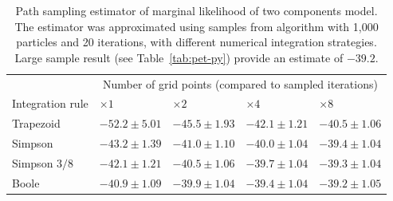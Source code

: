 \begin{table}
  \begingroup\small
  \begin{tabularx}{\linewidth}{lXXXX}
    \toprule
    & \multicolumn{4}{c}{Number of grid points (compared to sampled iterations)} \\
    \cmidrule(lr){2-5}
    Integration rule & $\times1$ & $\times2$ & $\times4$ & $\times8$ \\
    \midrule
    Trapezoid
    & $-52.2\pm5.01$ & $-45.5\pm1.93$ & $-42.1\pm1.21$ & $-40.5\pm1.06$ \\
    Simpson
    & $-43.2\pm1.39$ & $-41.0\pm1.10$ & $-40.0\pm1.04$ & $-39.4\pm1.04$ \\
    Simpson $3/8$
    & $-42.1\pm1.21$ & $-40.5\pm1.06$ & $-39.7\pm1.04$ & $-39.3\pm1.04$ \\
    Boole
    & $-40.9\pm1.09$ & $-39.9\pm1.04$ & $-39.4\pm1.04$ & $-39.2\pm1.05$ \\
    \bottomrule
  \end{tabularx}\endgroup
  \caption[\protect\pet compartmental model path sampling estimates bias
  reduction]
  {Path sampling estimator of marginal likelihood of two components
    \pet model. The estimator was approximated using samples from \smc[2]
    algorithm with 1,000 particles and 20 iterations, with different numerical
    integration strategies. Large sample result (see Table~\ref{tab:pet-py})
    provide an estimate of $-39.2$.}
  \label{tab:pet-bias}
\end{table}
